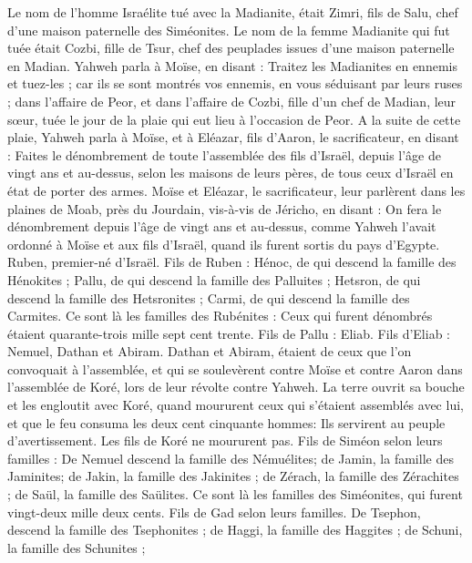 \begin{multicols}{2}
Le nom de l'homme Israélite tué avec la Madianite, était Zimri, fils de Salu, chef d'une maison paternelle des Siméonites.
Le nom de la femme Madianite qui fut tuée était Cozbi, fille de Tsur, chef des peuplades issues d’une maison paternelle en Madian.
Yahweh parla à Moïse, en disant :
Traitez les Madianites en ennemis et tuez-les ;
car ils se sont montrés vos ennemis, en vous séduisant par leurs ruses ; dans l’affaire de Peor, et dans l’affaire de Cozbi, fille d'un chef de Madian, leur sœur, tuée le jour de la plaie qui eut lieu à l’occasion de Peor.
\VerseOne{}A la suite de cette plaie, Yahweh parla à Moïse, et à Eléazar, fils d'Aaron, le sacrificateur, en disant :
Faites le dénombrement de toute l'assemblée des fils d'Israël, depuis l'âge de vingt ans et au-dessus, selon les maisons de leurs pères, de tous ceux d'Israël en état de porter des armes.
Moïse et Eléazar, le sacrificateur, leur parlèrent dans les plaines de Moab, près du Jourdain, vis-à-vis de Jéricho, en disant :
On fera le dénombrement depuis l'âge de vingt ans et au-dessus, comme Yahweh l'avait ordonné à Moïse et aux fils d'Israël, quand ils furent sortis du pays d'Egypte.
Ruben, premier-né d'Israël. Fils de Ruben : Hénoc, de qui descend la famille des Hénokites ; Pallu, de qui descend la famille des Palluites ;
Hetsron, de qui descend la famille des Hetsronites ; Carmi, de qui descend la famille des Carmites.
Ce sont là les familles des Rubénites : Ceux qui furent dénombrés étaient quarante-trois mille sept cent trente.
Fils de Pallu : Eliab.
Fils d'Eliab : Nemuel, Dathan et Abiram. Dathan et Abiram, étaient de ceux que l'on convoquait à l'assemblée, et qui se soulevèrent contre Moïse et contre Aaron dans l'assemblée de Koré, lors de leur révolte contre Yahweh.
La terre ouvrit sa bouche et les engloutit avec Koré, quand moururent ceux qui s’étaient assemblés avec lui, et que le feu consuma les deux cent cinquante hommes: Ils servirent au peuple d’avertissement.
Les fils de Koré ne moururent pas.
Fils de Siméon selon leurs familles : De Nemuel descend la famille des Némuélites; de Jamin, la famille des Jaminites; de Jakin, la famille des Jakinites ;
de Zérach, la famille des Zérachites ; de Saül, la famille des Saülites.
Ce sont là les familles des Siméonites, qui furent vingt-deux mille deux cents.
Fils de Gad selon leurs familles. De Tsephon, descend la famille des Tsephonites ; de Haggi, la famille des Haggites ; de Schuni, la famille des Schunites ;

\end{multicols}
